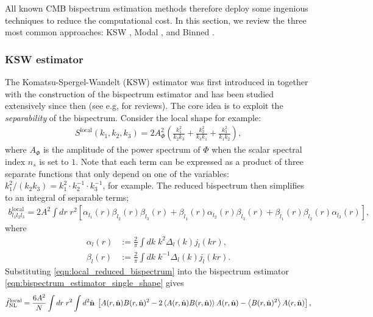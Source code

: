 All known CMB bispectrum estimation methods therefore deploy some ingenious techniques to reduce the computational cost. In this section, we review the three most common approaches: KSW \cite{Komatsu2005,Creminelli2006limits}, Modal \cite{Fergusson2010general,Fergusson2012}, and Binned \cite{Bucher2010,Bucher2016}.

\subsubsection*{KSW estimator}
The Komatsu-Spergel-Wandelt (KSW) estimator was first introduced in \cite{Komatsu2005} together with the construction of the bispectrum estimator and has been studied extensively since then \cite{Creminelli2006limits,Babich2005optimal,Creminelli2007estimators} (see e.g, \cite{Komatsu2010} for reviews). The core idea is to exploit the \textit{separability} of the bispectrum. Consider the local shape for example:
\begin{align}
	S^\textrm{local}(k_1, k_2, k_3) = 2A_\Phi^2 \left( \frac{k_1^2}{k_2 k_3} + \frac{k_2^2}{k_3 k_1} +  \frac{k_3^2}{k_1 k_2} \right),
\end{align}
where $A_\Phi$ is the amplitude of the power spectrum of $\Phi$ when the scalar spectral index $n_s$ is set to $1$. Note that each term can be expressed as a product of three separate functions that only depend on one of the variables: $k_1^2/(k_2 k_3) = k_1^2 \cdot k_2^{-1} \cdot k_3^{-1}$, for example. The reduced bispectrum then simplifies to an integral of separable terms;
\begin{align}
	b^\textrm{local}_{l_1 l_2 l_3} = 2A^2 \int dr \; r^2 \left[ \alpha_{l_1}(r) \beta_{l_2}(r) \beta_{l_3}(r) + \beta_{l_1}(r) \alpha_{l_2}(r) \beta_{l_3}(r) + \beta_{l_1}(r) \beta_{l_2}(r) \alpha_{l_3}(r) \right], \label{eqn:local_reduced_bispectrum}
\end{align}
where
\begin{align}
	\alpha_l(r) &:= \frac{2}{\pi} \int dk \; k^2 \Delta_l(k) j_l(kr), \label{def:KSW_estimator_alpha}\\
	\beta_l(r) &:= \frac{2}{\pi} \int dk \; k^{-1} \Delta_l(k) j_l(kr). \label{def:KSW_estimator_beta}
\end{align}
Substituting \eqref{eqn:local_reduced_bispectrum} into the bispectrum estimator \eqref{eqn:bispectrum_estimator_single_shape} gives
\begin{align}
	\hat{f}^\textrm{local}_\text{NL} = \frac{6A^2}{N} \int dr \; r^2 \int d^2 \hat{\mathbf{n}} \; \left[ A(r,\hat{\mathbf{n}}) B(r,\hat{\mathbf{n}})^2 - 2 \left <A(r,\hat{\mathbf{n}}) B(r,\hat{\mathbf{n}}) \right> A(r,\hat{\mathbf{n}}) - \left< B(r,\hat{\mathbf{n}})^2 \right> A(r,\hat{\mathbf{n}})  \right], \label{eqn:KSW_estimator_local}
\end{align}

